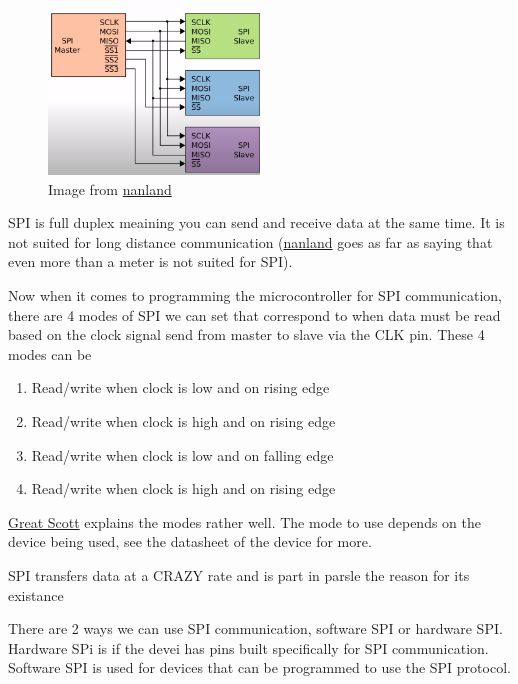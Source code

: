\documentclass{article}
\begin{document}
	\begin{figure}[H]
	\centering
	\includegraphics[width=0.5\textwidth]{images/multi_slave.png}
	\caption{Image from \href{https://www.youtube.com/watch?v=ba0SQwjTQfw}{nanland}}	
	\end{figure}

	SPI is full duplex meaining you can send and receive data at the same time. It is not suited for long distance communication (\href{https://www.youtube.com/watch?v=ba0SQwjTQfw}{nanland} goes as far as saying that even more than a meter is not suited for SPI).

	Now when it comes to programming the microcontroller for SPI communication, there are 4 modes of SPI we can set that correspond to when data must be read based on the clock signal send from master to slave via the CLK pin. These 4 modes can be 
	\begin{enumerate}
		\item Read/write when clock is low and on rising edge
		\item Read/write when clock is high and on rising edge
		\item Read/write when clock is low and on falling edge
		\item Read/write when clock is high and on rising edge
	\end{enumerate}

	\href{https://www.youtube.com/watch?v=fvOAbDMzoks&t=6s}{Great Scott} explains the modes rather well. The mode to use depends on the device being used, see the datasheet of the device for more.

	SPI transfers data at a CRAZY rate and is part in parsle the reason for its existance

	There are 2 ways we can use SPI communication, software SPI or hardware SPI. Hardware SPi is if the devei has pins built specifically for SPI communication. Software SPI is used for devices that can be programmed to use the SPI protocol.
	
\end{document}
